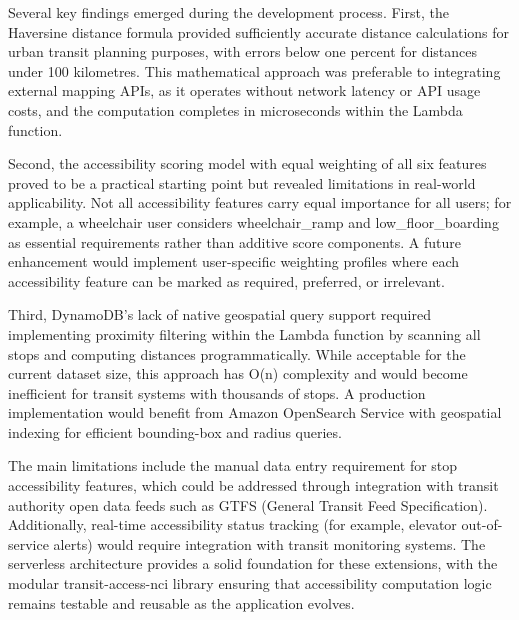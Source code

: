 \documentclass[conference]{IEEEtran}
\begin{document}
Several key findings emerged during the development process. First, the Haversine distance formula provided sufficiently accurate distance calculations for urban transit planning purposes, with errors below one percent for distances under 100 kilometres. This mathematical approach was preferable to integrating external mapping APIs, as it operates without network latency or API usage costs, and the computation completes in microseconds within the Lambda function.

Second, the accessibility scoring model with equal weighting of all six features proved to be a practical starting point but revealed limitations in real-world applicability. Not all accessibility features carry equal importance for all users; for example, a wheelchair user considers wheelchair\_ramp and low\_floor\_boarding as essential requirements rather than additive score components. A future enhancement would implement user-specific weighting profiles where each accessibility feature can be marked as required, preferred, or irrelevant.

Third, DynamoDB's lack of native geospatial query support required implementing proximity filtering within the Lambda function by scanning all stops and computing distances programmatically. While acceptable for the current dataset size, this approach has O(n) complexity and would become inefficient for transit systems with thousands of stops. A production implementation would benefit from Amazon OpenSearch Service with geospatial indexing for efficient bounding-box and radius queries.

The main limitations include the manual data entry requirement for stop accessibility features, which could be addressed through integration with transit authority open data feeds such as GTFS (General Transit Feed Specification). Additionally, real-time accessibility status tracking (for example, elevator out-of-service alerts) would require integration with transit monitoring systems. The serverless architecture provides a solid foundation for these extensions, with the modular transit-access-nci library ensuring that accessibility computation logic remains testable and reusable as the application evolves.
\end{document}
